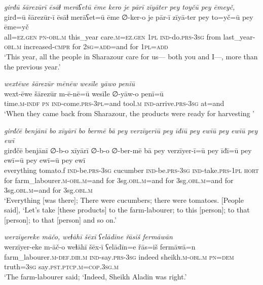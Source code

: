 \ea \label{PM.38}
\textit{girđū šārezūrī ēsāɫ merāʕetū ēme kero je pārī zīyāter pey toyčū pey ēmeyč,} \\ 
\gll girđ=ū šārezūr-ī ēsāɫ merāʕet=ū ēme ∅-ker-o je pār-ī zīyā-ter pey to=yč=ū pey ēme=yč \\ 
 all\textsc{\textsc{=ez.gen}} \textsc{pn}\textsc{-obl}\textsc{.m} this\_year care\textsc{.m}\textsc{\textsc{=ez.gen}} \textsc{1pl} \textsc{ind-}do\textsc{.prs}\textsc{-3sg} from last\_year\textsc{-obl}\textsc{.m} increased\textsc{-cmpr} for \textsc{2sg}\textsc{=add}=and for \textsc{1pl}\textsc{=add} \\ 
\glt `This year, all the people in Sharazour care for us— both you and I—, more than the previous year.'
\z 
 
\ea \label{PM.41}
\textit{wextēwe šārezūr mēnēw wesīle yāwo penīū} \\ 
\gll wext-ēwe šārezūr m-ē-nē=ū wesīle ∅-yāw-o penī=ū \\ 
 time\textsc{.m}\textsc{-indf} \textsc{pn} \textsc{ind-}come\textsc{.prs}\textsc{-3pl}=and tool\textsc{.m} \textsc{ind-}arrive\textsc{.prs}\textsc{-3sg} at=and \\ 
\glt `When they came back from Sharazour, the products were ready for harvesting  '
\z 
 
\ea \label{PM.43}
\textit{girđčē benjānī bo xīyārī bo bermē bā pey verzīyerīū pey īđīū pey ewīū pey ewīū pey ewī} \\ 
\gll girđčē benjānī ∅-b-o xīyārī ∅-b-o ∅-ber-mē bā pey verzīyer-ī=ū pey īđī=ū pey ewī=ū pey ewī=ū pey ewī \\ 
 everything tomato.f \textsc{ind-}be\textsc{.prs}\textsc{-3sg} cucumber \textsc{ind-}be\textsc{.prs}\textsc{-3sg} \textsc{ind-}take\textsc{.prs}\textsc{-1pl} \textsc{hort} for farm\_labourer\textsc{.m}\textsc{-obl}\textsc{.m}=and for 3sg\textsc{.obl}\textsc{.m}=and for 3sg\textsc{.obl}\textsc{.m}=and for 3sg\textsc{.obl}\textsc{.m}=and for 3sg\textsc{.obl}\textsc{.m} \\ 
\glt `Everything [was there]; There were cucumbers; there were tomatoes. [People said], ‘Let’s take [these products] to the farm-labourer; to this [person]; to that [person]; to that [person] and so on.'
\z 
 
\ea \label{PM.44}
\textit{werzīyereke māčo, weɫāhī šēxī ʕelādīne řāsiš fermāwān} \\ 
\gll werzīyer-eke m-āč-o weɫāhī šēx-ī ʕelādīn=e řās=iš fermāwā=n \\ 
 farm\_labourer\textsc{.m}\textsc{-def}\textsc{.dir}\textsc{.m} \textsc{ind-}say\textsc{.prs}\textsc{-3sg} indeed sheikh\textsc{.m}\textsc{-obl}\textsc{.m} \textsc{pn}\textsc{=dem} truth\textsc{=3sg} say\textsc{.pst}\textsc{.ptcp}\textsc{.m}\textsc{=cop}\textsc{.3sg}\textsc{.m} \\ 
\glt `The farm-labourer said; ‘Indeed, Sheikh Aladin was right.'
\z 
 
